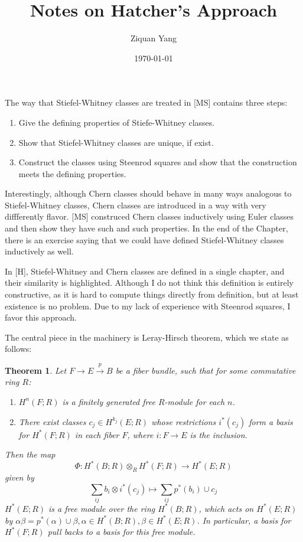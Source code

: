 \documentclass[12pt]{article}
\theoremstyle{plain}
\newtheorem{theorem}[equation]{Theorem}
\theoremstyle{definition}
\newcommand\tensor{{\otimes}}
\newcommand{\<}{\langle}
\renewcommand{\>}{\rangle}
\begin{document}
%

\title{Notes on Hatcher's Approach}
\author{Ziquan Yang}


\date{\today}

\maketitle
 


\setcounter{section}{0}


The way that Stiefel-Whitney classes are treated in [MS] contains three steps:
\begin{enumerate}
\item Give the defining properties of Stiefe-Whitney classes. 
\item Show that Stiefel-Whitney classes are unique, if exist. 
\item Construct the classes using Steenrod squares and show that the construction meets the defining properties. 
\end{enumerate}

Interestingly, although Chern classes should behave in many ways analogous to Stiefel-Whitney classes, Chern classes are introduced in a way with very diffferently flavor. [MS] construced Chern classes inductively using Euler classes and then show they have such and such properties. In the end of the Chapter, there is an exercise saying that we could have defined Stiefel-Whitney classes inductively as well. 

In [H], Stiefel-Whitney and Chern classes are defined in a single chapter, and their similarity is highlighted. Although I do not think this definition is entirely constructive, as it is hard to compute things directly from definition, but at least existence is no problem. Due to my lack of experience with Steenrod squares, I favor this approach. 

The central piece in the machinery is Leray-Hirsch theorem, which we state as follows:
\begin{theorem}
Let $F \to E \stackrel{p}{\to} B$ be a fiber bundle, such that for some commutative ring $R$: 
\begin{enumerate}
\item $H^n(F; R)$ is a finitely generated free $R$-module for each $n$. 
\item There exist classes $c_j \in H^{k_j}(E; R)$ whose restrictions $i^*(c_j)$ form a basis for $H^*(F; R)$ in each fiber $F$, where $i : F \to E$ is the inclusion. 
\end{enumerate}
Then the map
$$ \Phi : H^*(B; R) \tensor_R H^*(F; R) \to H^*(E; R)$$
given by 
$$ \sum_{ij} b_i \tensor i^*(c_j) \mapsto \sum_{ij} p^*(b_i) \cup c_j $$
$H^*(E; R)$ is a free module over the ring $H^*(B; R)$, which acts on $H^*(E; R)$ by $\alpha \beta = p^*(\alpha) \cup \beta, \alpha \in H^*(B; R), \beta \in H^*(E; R)$. In particular, a basis for $H^*(F; R)$ pull backs to a basis for this free module.
\end{theorem}
\end{document}
